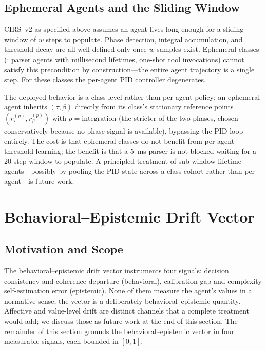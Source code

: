 \documentclass[11pt,twocolumn]{article}
\begin{document}
\subsection{Ephemeral Agents and the Sliding Window}
\label{sec:cirs-ephemeral}

CIRS~v2 as specified above assumes an agent lives long enough for
a sliding window of $w$ steps to populate. Phase detection, integral
accumulation, and threshold decay are all well-defined only once
$w$ samples exist. Ephemeral classes (: parser
agents with millisecond lifetimes, one-shot tool invocations) cannot
satisfy this precondition by construction---the entire agent
trajectory is a single step. For these classes the per-agent PID
controller degenerates.

The deployed behavior is a class-level rather than per-agent
policy: an ephemeral agent inherits $(\tau, \beta)$ directly from
its class's stationary reference points $(r_\tau^{(p)},
r_\beta^{(p)})$ with $p = \text{integration}$ (the stricter of the
two phases, chosen conservatively because no phase signal is
available), bypassing the PID loop entirely. The cost is that
ephemeral classes do not benefit from per-agent threshold learning;
the benefit is that a 5~ms parser is not blocked waiting for a
20-step window to populate. A principled treatment of
sub-window-lifetime agents---possibly by pooling the PID state
across a class cohort rather than per-agent---is future work.


\section{Behavioral--Epistemic Drift Vector}
\label{sec:ethical-drift}

\subsection{Motivation and Scope}

The behavioral--epistemic drift vector instruments four signals:
decision consistency and coherence departure (behavioral),
calibration gap and complexity self-estimation error (epistemic).
None of them measure the agent's values in a normative sense; the
vector is a deliberately behavioral--epistemic quantity.
Affective and value-level drift are distinct channels that a
complete treatment would add; we discuss those as future work at
the end of this section. The remainder of this section grounds
the behavioral--epistemic vector in four measurable signals, each
bounded in $[0,1]$.
\end{document}
